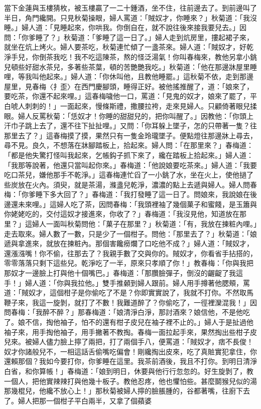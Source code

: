 當下金蓮與玉樓猜枚，被玉樓贏了一二十鍾酒，坐不住，往前邊去了。到前邊叫了半日，角門纔開。只見秋菊操眼，婦人罵道：「賊奴才，你睡來？」秋菊道：「我沒睡。」婦人道：「見睡起來，你哄我。你倒自在，就不說往後來接我要兒去。」因問：「你爹睡了？」秋菊道：「爹睡了這一日了。」婦人走到炕房里，摟起裙子來，就坐在炕上烤火。婦人要茶吃，秋菊連忙傾了一盞茶來。婦人道：「賊奴才，好乾淨手兒，你倒茶我吃！我不吃這陳茶，熬的怪泛湯氣！你叫春梅來，教他另拿小銚兒頓些好甜水茶兒，多著些茶葉，頓的苦艷艷我吃。」秋菊道：「他在那邊牀屋里睡哩，等我叫他起來。」婦人道：「你休叫他，且教他睡罷。」這秋菊不依，走到那邊屋里，見春梅〈扌歪〉在西門慶腳頭，睡得正好。被他搖推醒了，道：「娘來了，要吃茶，你還不起來哩。」這春梅噦他一口，罵道：「見鬼的奴才，娘來了罷了，平白唬人刺刺的！」一面起來，慢條斯禮，撒腰拉袴，走來見婦人。只顧倚著眼兒揉眼。婦人反罵秋菊：「恁奴才！你睡的甜甜兒的，把你叫醒了。」因教他：「你頭上汗巾子跳上去了，還不往下扯扯哩。」又問：「你耳躲上墜子，怎的只帶著一隻？往那里去了？」這春梅摸了摸，果然只有一隻金玲瓏墜子。便點燈往那邊牀上尋去，尋不見。良久，不想落在牀腳踏板上，拾起來。婦人問：「在那里來？」春梅道：「都是他失驚打怪叫我起來，乞帳鈎子抓下來了，纔在踏板上拾起來。」婦人道：「我那等說著，他還只當叫起你來。」春梅道：「他說娘要吃茶來。」婦人道：「我要吃口茶兒，嫌他那手不乾淨。」這春梅連忙舀了一小銚了水，坐在火上，使他撾了些炭放在火內。須臾，就是茶湯，滌盞兒乾淨，濃濃的點上去遞與婦人。婦人問春梅：「你爹睡下多大回了？」春梅道：「我打發睡了這一日了。問娘來，我說娘在後邊還未來哩。」這婦人吃了茶，因問春梅：「我頭裡袖了幾個菓子和蜜餞，是玉簫與你姥姥吃的，交付這奴才接進來，你收了？」春梅道：「我沒見他，知道放在那里？」這婦人一面叫秋菊問他：「菓子在那里？」秋菊道：「有，我放在揀粧內哩。」走去取來。婦人數了一數，只是少了一個柑子。問他：「那里去了？」秋菊道：「娘遞與拿進來，就放在揀粧內。那個害饞癆爛了口吃他不成？」婦人道：「賊奴才，還漲漒嘴！你不偷，往那去了？我親手數了交與你的。賊奴才，你看省手拈搭的，零零落落只剩下這些兒。乾淨吃了一半，原來只孝順了你！」教春梅：「你與我把那奴才一邊臉上打與他十個嘴巴。」春梅道：「那臢臉彈子，倒沒的齷齪了我這手！」婦人道：「你與我拉他。」雙手推顙到婦人跟前。婦人用手撙著他腮頰，罵道：「賊奴才，這個柑子是你偷吃了不是？你即實實說了，我就不打你。不然取馬鞭子來，我這一旋剝，就打了不數！我難道醉了？你偷吃了，一徑裡灤混我！」因問春梅：「我醉不醉？」那春梅道：「娘清淨白淨，那討酒來？娘信他，不是他吃了。娘不信，掏他袖子，怕不的還有柑子皮兒在袖子裡不止的。」婦人于是扯過他袖子來，用手掏他袖子，用手撇著不教掏。春梅一面拉起手來，果然掏出些柑子皮兒來。被婦人儘力臉上擰了兩把，打了兩個手八，便罵道：「賊奴才，痞不長俊！奴才你諸般兒不，一相這話舌偷嘴吃偏會！剛纔掏出皮來，吃了真賍實犯拿住，你還賴那個？我如今要打你，你爹睡在這里。我茶前酒後，我且不打你。到明日清淨白省，和你算帳！」春梅道：「娘到明日，休要與他行行忽忽的。好生旋剝了，教一個人，把他實辣辣打與他幾十板子。教他忍疼，他也懼怕些。甚麼鬬猴兒似的湯那幾棍兒，他纔不放心上！」那秋菊被婦人擰的臉脹腫的，谷都著嘴，往廚下去了。婦人把那一個柑子平白兩半，又拿了個蘋婆 
